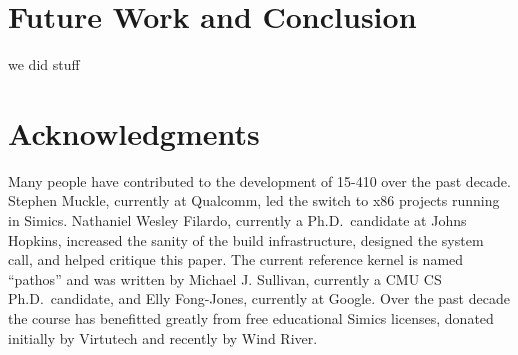 \section{Future Work and Conclusion}
\label{sec:future}

we did stuff

\section*{Acknowledgments}

Many people have contributed to the development of
15-410 over the past decade.
Stephen Muckle, currently at Qualcomm, led
the switch to x86 projects running in Simics.
Nathaniel Wesley Filardo,
currently a Ph.D.\ candidate at Johns Hopkins,
increased the sanity of the build infrastructure,
designed the  system call, and helped critique this paper.
The current reference kernel is named ``pathos''
and was written by Michael J. Sullivan,
currently a CMU CS Ph.D.\ candidate,
and Elly Fong-Jones, currently at Google.
Over the past decade the course has benefitted
greatly from free educational Simics licenses,
donated initially by Virtutech and recently by
Wind River.
